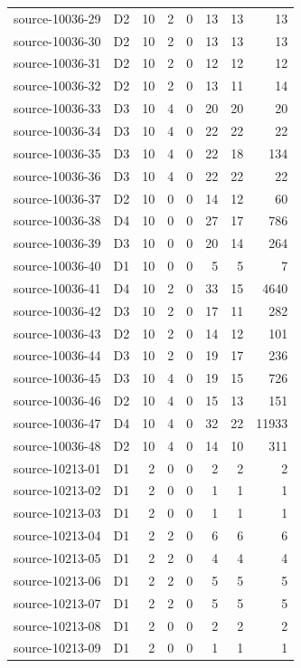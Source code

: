 \begin{longtable}{llrrrrrr}
source-10036-29 & D2 & 10 & 2 & 0 & 13 & 13 & 13\\
source-10036-30 & D2 & 10 & 2 & 0 & 13 & 13 & 13\\
source-10036-31 & D2 & 10 & 2 & 0 & 12 & 12 & 12\\
source-10036-32 & D2 & 10 & 2 & 0 & 13 & 11 & 14\\
source-10036-33 & D3 & 10 & 4 & 0 & 20 & 20 & 20\\
source-10036-34 & D3 & 10 & 4 & 0 & 22 & 22 & 22\\
source-10036-35 & D3 & 10 & 4 & 0 & 22 & 18 & 134\\
source-10036-36 & D3 & 10 & 4 & 0 & 22 & 22 & 22\\
source-10036-37 & D2 & 10 & 0 & 0 & 14 & 12 & 60\\
source-10036-38 & D4 & 10 & 0 & 0 & 27 & 17 & 786\\
source-10036-39 & D3 & 10 & 0 & 0 & 20 & 14 & 264\\
source-10036-40 & D1 & 10 & 0 & 0 & 5 & 5 & 7\\
source-10036-41 & D4 & 10 & 2 & 0 & 33 & 15 & 4640\\
source-10036-42 & D3 & 10 & 2 & 0 & 17 & 11 & 282\\
source-10036-43 & D2 & 10 & 2 & 0 & 14 & 12 & 101\\
source-10036-44 & D3 & 10 & 2 & 0 & 19 & 17 & 236\\
source-10036-45 & D3 & 10 & 4 & 0 & 19 & 15 & 726\\
source-10036-46 & D2 & 10 & 4 & 0 & 15 & 13 & 151\\
source-10036-47 & D4 & 10 & 4 & 0 & 32 & 22 & 11933\\
source-10036-48 & D2 & 10 & 4 & 0 & 14 & 10 & 311\\
source-10213-01 & D1 & 2 & 0 & 0 & 2 & 2 & 2\\
source-10213-02 & D1 & 2 & 0 & 0 & 1 & 1 & 1\\
source-10213-03 & D1 & 2 & 0 & 0 & 1 & 1 & 1\\
source-10213-04 & D1 & 2 & 2 & 0 & 6 & 6 & 6\\
source-10213-05 & D1 & 2 & 2 & 0 & 4 & 4 & 4\\
source-10213-06 & D1 & 2 & 2 & 0 & 5 & 5 & 5\\
source-10213-07 & D1 & 2 & 2 & 0 & 5 & 5 & 5\\
source-10213-08 & D1 & 2 & 0 & 0 & 2 & 2 & 2\\
source-10213-09 & D1 & 2 & 0 & 0 & 1 & 1 & 1\\

\end{longtable}
